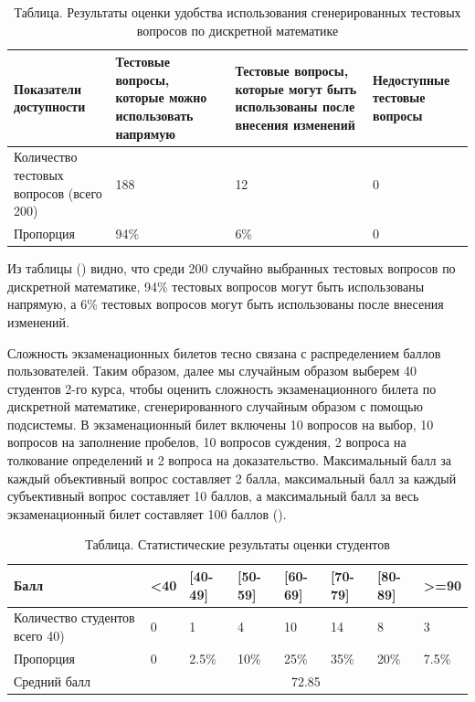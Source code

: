 \begin{table}[!htbp]
	\centering
	\caption{Таблица. Результаты оценки удобства использования сгенерированных тестовых вопросов по дискретной математике}
	\label{tab:usability_test_questions}
		\begin{tabular}{|p{}|p{}|p{}|p{}|} 
			\hline 
			Показатели доступности&Тестовые вопросы,  которые можно использовать напрямую&Тестовые вопросы, которые могут быть использованы после внесения изменений&Недоступные тестовые вопросы\\
			\hline  
			Количество тестовых вопросов (всего 200)&188&12&0\\
			\hline
			Пропорция&94\%&6\%&0\\
			\hline  
		\end{tabular}
\end{table}

Из таблицы (\textit{}) видно, что среди 200 случайно выбранных тестовых вопросов по дискретной математике, 94\% тестовых вопросов могут быть использованы  напрямую, а 6\% тестовых вопросов могут быть использованы после внесения изменений.

Сложность экзаменационных билетов тесно связана с распределением баллов пользователей. Таким образом, далее мы случайным образом выберем 40 студентов 2-го курса, чтобы оценить сложность экзаменационного билета по дискретной математике, сгенерированного случайным образом с помощью подсистемы. В экзаменационный билет включены 10 вопросов на выбор, 10 вопросов на заполнение пробелов, 10 вопросов суждения, 2 вопроса на толкование определений и 2 вопроса на доказательство. Максимальный балл за каждый объективный вопрос составляет 2 балла, максимальный балл за каждый субъективный вопрос составляет 10 баллов, а максимальный балл за весь экзаменационный билет составляет 100 баллов (\textit{}). 

\begin{table}[!htbp]
	\centering
	\caption{Таблица. Статистические результаты оценки студентов}
	\label{tab:score_exam_paper}
		\begin{tabular}{|p{}|p{}|p{}|p{}|p{}|p{}|p{}|p{}|} 
			\hline 
			Балл& <40 & [40-49] & [50-59] & [60-69] & [70-79] & [80-89] & >=90 \\
			\hline  
			Количество студентов всего 40) & 0 & 1 & 4 & 10 & 14 & 8 &3 \\
			\hline
			Пропорция & 0 & 2.5\% & 10\% & 25\% & 35\% & 20\% & 7.5\% \\
			\hline
			Средний балл & \multicolumn{7}{c|}{72.85} \\
			\hline  
		\end{tabular}
\end{table}

